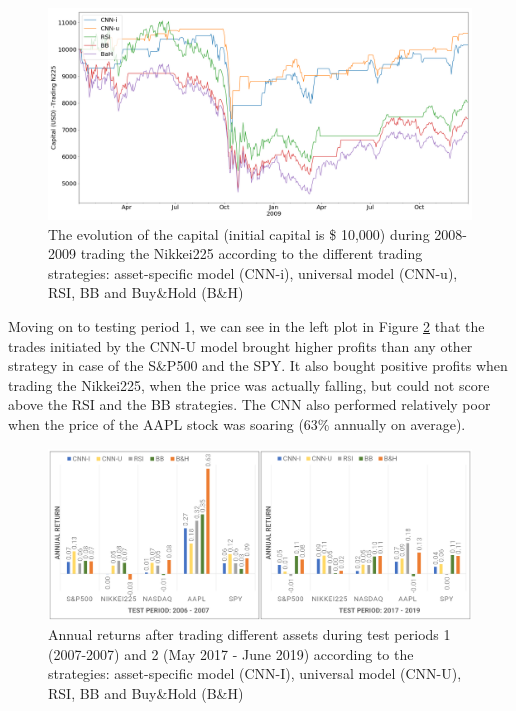 \documentclass[11pt, a4paper]{article}
\begin{document}
\begin{figure}[ht]
    \centering
    \includegraphics[width=\textwidth]{images/capitals/Capitals2_N225.png}
    \caption{The evolution of the capital (initial capital is \$ 10,000) during 2008-2009 trading the Nikkei225 according to the different trading strategies: asset-specific model (CNN-i), universal model (CNN-u), RSI, BB and Buy\&Hold (B\&H)}
    \label{fig:N225capevol}
\end{figure}

Moving on to testing period 1, we can see in the left plot in Figure \ref{fig:CNNvsComp_P1P3} that the trades initiated by the CNN-U model brought higher profits than any other strategy in case of the S\&P500 and the SPY. It also bought positive profits when trading the Nikkei225, when the price was actually falling, but could not score above the RSI and the BB strategies. The CNN also performed relatively poor when the price of the AAPL stock was soaring (63\% annually on average). 



\begin{figure}[ht]
    \centering
    \includegraphics[width=\textwidth]{images/CNNvsComp_P1P3.png}
    \caption{Annual returns after trading different assets during test periods 1 (2007-2007) and 2 (May 2017 - June 2019) according to the strategies: asset-specific model (CNN-I), universal model (CNN-U), RSI, BB and Buy\&Hold (B\&H)}
    \label{fig:CNNvsComp_P1P3}
\end{figure}
\end{document}

